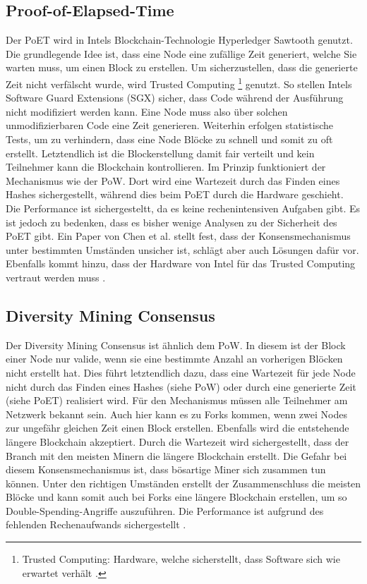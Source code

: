 \subsection{Proof-of-Elapsed-Time}
Der \acs{PoET} wird in Intels Blockchain-Technologie Hyperledger Sawtooth genutzt. Die grundlegende Idee ist, dass eine Node eine zufällige Zeit generiert, welche Sie warten muss, um einen Block zu erstellen. Um sicherzustellen, dass die generierte Zeit nicht verfälscht wurde, wird Trusted Computing \footnote{Trusted Computing: Hardware, welche sicherstellt, dass Software sich wie erwartet verhält \cite{MitchellTrustedComputing2005}.} genutzt. So stellen Intels Software Guard Extensions (SGX) sicher, dass Code während der Ausführung nicht modifiziert werden kann. Eine Node muss also über solchen unmodifizierbaren Code eine Zeit generieren. Weiterhin erfolgen statistische Tests, um zu verhindern, dass eine Node Blöcke zu schnell und somit zu oft erstellt. Letztendlich ist die Blockerstellung damit fair verteilt und kein Teilnehmer kann die Blockchain kontrollieren. Im Prinzip funktioniert der Mechanismus wie der \acs{PoW}. Dort wird eine Wartezeit durch das Finden eines Hashes sichergestellt, während dies beim \acs{PoET} durch die Hardware geschieht. Die Performance ist sichergesteltt, da es keine rechenintensiven Aufgaben gibt. Es ist jedoch zu bedenken, dass es bisher wenige Analysen zu der Sicherheit des \acs{PoET} gibt. Ein Paper von Chen et al. stellt fest, dass der Konsensmechanismus unter bestimmten Umständen unsicher ist, schlägt aber auch Lösungen dafür vor. Ebenfalls kommt hinzu, dass der Hardware von Intel für das Trusted Computing vertraut werden muss \cite{ChenSecurityAnalysisProofofElapsedTime2017}.

\subsection{Diversity Mining Consensus}
Der Diversity Mining Consensus ist ähnlich dem \acs{PoW}. In diesem ist der Block einer Node nur valide, wenn sie eine bestimmte Anzahl an vorherigen Blöcken nicht erstellt hat. Dies führt letztendlich dazu, dass eine Wartezeit für jede Node nicht durch das Finden eines Hashes (siehe \acs{PoW}) oder durch eine generierte Zeit (siehe \acs{PoET}) realisiert wird. Für den Mechanismus müssen alle Teilnehmer am Netzwerk bekannt sein. Auch hier kann es zu Forks kommen, wenn zwei Nodes zur ungefähr gleichen Zeit einen Block erstellen. Ebenfalls wird die entstehende längere Blockchain akzeptiert. Durch die Wartezeit wird sichergestellt, dass der Branch mit den meisten Minern die längere Blockchain erstellt. Die Gefahr bei diesem Konsensmechanismus ist, dass bösartige Miner sich zusammen tun können. Unter den richtigen Umständen erstellt der Zusammenschluss die meisten Blöcke und kann somit auch bei Forks eine längere Blockchain erstellen, um so Double-Spending-Angriffe auszuführen. Die Performance ist aufgrund des fehlenden Rechenaufwands sichergestellt \cite{GreenspanMultiChainPrivateBlockchain2015}\cite{CachinBlockchainConsensusProtocols2017}.

